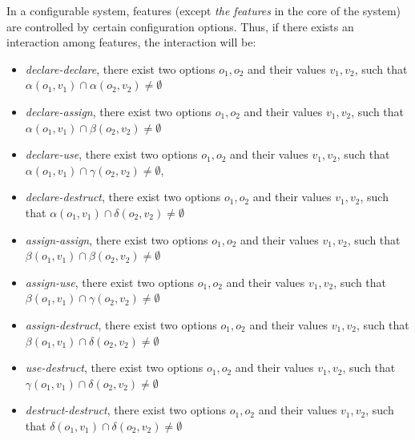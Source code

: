  In a configurable
system, features (except \textit{the features} in the core of the
system) are controlled by certain configuration options. Thus, if
there exists an interaction among features, the interaction will
be:

\begin{itemize}[leftmargin=4mm]

\item \textit{declare-declare}, there exist two options $o_1, o_2$ and their values $v_1, v_2$, such that $\alpha(o_1, v_1) \cap \alpha(o_2, v_2) \neq \emptyset$

\item \textit{declare-assign}, there exist two options $o_1, o_2$ and their values $v_1, v_2$, such that $\alpha(o_1, v_1) \cap \beta(o_2, v_2) \neq \emptyset$

\item \textit{declare-use}, there exist two options $o_1, o_2$ and their values $v_1, v_2$, such that $\alpha(o_1, v_1) \cap \gamma(o_2, v_2) \neq \emptyset$,

\item \textit{declare-destruct}, there exist two options $o_1, o_2$ and their values $v_1, v_2$, such that $\alpha(o_1, v_1) \cap \delta(o_2, v_2) \neq \emptyset$

\item \textit{assign-assign}, there exist two options $o_1, o_2$ and their values $v_1, v_2$, such that $\beta(o_1, v_1) \cap \beta(o_2, v_2) \neq \emptyset$

\item \textit{assign-use}, there exist two options $o_1, o_2$ and their values $v_1, v_2$, such that $\beta(o_1, v_1) \cap \gamma(o_2, v_2) \neq \emptyset$

\item \textit{assign-destruct}, there exist two options $o_1, o_2$ and their values $v_1, v_2$, such that $\beta(o_1, v_1) \cap \delta(o_2, v_2) \neq \emptyset$

\item \textit{use-destruct}, there exist two options $o_1, o_2$ and their values $v_1, v_2$, such that $\gamma(o_1, v_1) \cap \delta(o_2, v_2) \neq \emptyset$

\item \textit{destruct-destruct}, there exist two options $o_1, o_2$ and their values $v_1, v_2$, such that $\delta(o_1, v_1) \cap \delta(o_2, v_2) \neq \emptyset$

\end{itemize}

